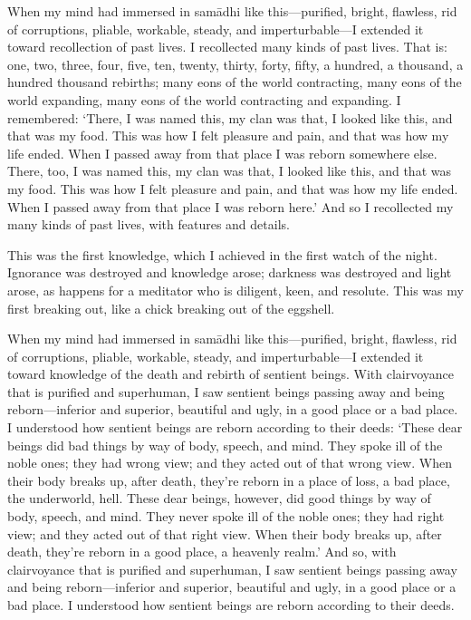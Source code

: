 \documentclass[12pt,openany]{book}%
\begin{document}
When my mind had immersed in \textsanskrit{samādhi} like this—purified, bright, flawless, rid of corruptions, pliable, workable, steady, and imperturbable—I extended it toward recollection of past lives. I recollected many kinds of past lives. That is: one, two, three, four, five, ten, twenty, thirty, forty, fifty, a hundred, a thousand, a hundred thousand rebirths; many eons of the world contracting, many eons of the world expanding, many eons of the world contracting and expanding. I remembered: ‘There, I was named this, my clan was that, I looked like this, and that was my food. This was how I felt pleasure and pain, and that was how my life ended. When I passed away from that place I was reborn somewhere else. There, too, I was named this, my clan was that, I looked like this, and that was my food. This was how I felt pleasure and pain, and that was how my life ended. When I passed away from that place I was reborn here.’ And so I recollected my many kinds of past lives, with features and details. 

This was the first knowledge, which I achieved in the first watch of the night. Ignorance was destroyed and knowledge arose; darkness was destroyed and light arose, as happens for a meditator who is diligent, keen, and resolute. This was my first breaking out, like a chick breaking out of the eggshell. 

When my mind had immersed in \textsanskrit{samādhi} like this—purified, bright, flawless, rid of corruptions, pliable, workable, steady, and imperturbable—I extended it toward knowledge of the death and rebirth of sentient beings. With clairvoyance that is purified and superhuman, I saw sentient beings passing away and being reborn—inferior and superior, beautiful and ugly, in a good place or a bad place. I understood how sentient beings are reborn according to their deeds: ‘These dear beings did bad things by way of body, speech, and mind. They spoke ill of the noble ones; they had wrong view; and they acted out of that wrong view. When their body breaks up, after death, they’re reborn in a place of loss, a bad place, the underworld, hell. These dear beings, however, did good things by way of body, speech, and mind. They never spoke ill of the noble ones; they had right view; and they acted out of that right view. When their body breaks up, after death, they’re reborn in a good place, a heavenly realm.’ And so, with clairvoyance that is purified and superhuman, I saw sentient beings passing away and being reborn—inferior and superior, beautiful and ugly, in a good place or a bad place. I understood how sentient beings are reborn according to their deeds. 
\end{document}
